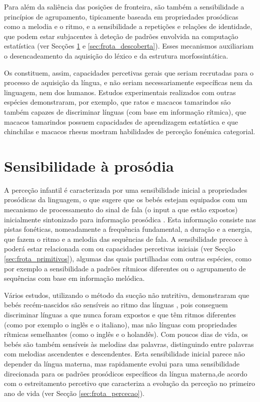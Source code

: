 \documentclass[output=paper]{LSP/langsci}
\begin{document}
Para além da saliência das posições de fronteira, são também  a sensibilidade a princípios de agrupamento, tipicamente baseada em propriedades prosódicas como a melodia e o ritmo, e a sensibilidade a repetições e relações de identidade, que podem estar subjacentes à deteção de padrões envolvida na computação estatística (ver Secções \ref{sec:frota_sensibilidade} e \ref{sec:frota_descoberta}). Esses mecanismos auxiliariam o desencadeamento da aquisição do léxico e da estrutura morfossintática. 

Os  constituem, assim, capacidades percetivas gerais que seriam recrutadas para o processo de aquisição da língua, e não seriam necessariamente específicas nem da linguagem, nem dos humanos. Estudos experimentais realizados com outras espécies demonstraram, por exemplo, que ratos e macacos tamarindos são também capazes de discriminar línguas (com base em informação rítmica), que macacos tamarindos possuem capacidades de aprendizagem estatística e que chinchilas e macacos rhesus mostram habilidades de perceção fonémica categorial. 

\section{Sensibilidade à prosódia}
\label{sec:frota_sensibilidade}
A perceção infantil é caracterizada por uma sensibilidade inicial a propriedades prosódicas da linguagem, o que sugere que os bebés estejam equipados com um mecanismo de processamento do sinal de fala (o input a que estão expostos) inicialmente sintonizado para informação prosódica \citep{morgandemuth1996,jusczyk1997}. Esta informação consiste nas pistas fonéticas, nomeadamente a frequência fundamental, a duração e a energia, que fazem o ritmo e a melodia das sequências de fala. A sensibilidade precoce à  poderá estar relacionada com  ou capacidades percetivas iniciais (ver Secção \ref{sec:frota_primitivos}), algumas das quais partilhadas com outras espécies, como por exemplo a sensibilidade a padrões rítmicos diferentes ou o agrupamento de sequências com base em informação melódica.

Vários estudos, utilizando o método da sucção não nutritiva, demonstraram que bebés recém-nascidos são sensíveis ao ritmo das línguas \citep{nazzi_etal1998,gervainmehler2010}, pois conseguem discriminar línguas a que nunca foram expostos e que têm ritmos diferentes (como por exemplo o inglês e o italiano), mas não línguas com propriedades rítmicas semelhantes (como o inglês e o holandês). Com poucos dias de vida, os bebés são também sensíveis às melodias das palavras, distinguindo entre palavras com melodias ascendentes e descendentes. Esta sensibilidade inicial parece não depender da língua materna, mas rapidamente evolui para uma sensibilidade direcionada para os padrões prosódicos específicos da língua materna,\largerpage de acordo com o estreitamento percetivo que caracteriza a evolução da perceção no primeiro ano de vida (ver Secção \ref{sec:frota_percecao}).
\end{document}
